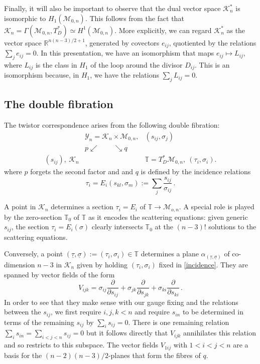 \documentclass[11pt]{article}
\newcommand{\R}{\mathbb{R}}
\newcommand{\T}{\mathbb{T}}
\newcommand{\p}{\partial}
\newcommand{\cK}{\mathcal{K}}
\newcommand{\cM}{\mathcal{M}}
\newcommand{\cY}{\mathcal{Y}}
\newcommand{\bs}{\underline{\sigma}}
\newcommand{\bt}{\underline{\tau}}
\newcommand{\1}{{\rm 1\hskip-0.25em I}}
\begin{document}
Finally, it will also be important to observe that the dual vector space $\cK_n^*$ is isomorphic to $H_1(\cM_{0,n})$. This follows from the fact that $\cK_n = \Gamma(\cM_{0,n},T^*_D) \simeq H^1(\cM_{0,n}).$ More explicitly, we can regard $\cK_n^*$ as the vector space $\R^{n(n-3)/2+1}$, generated by covectors $e_{ij}$, quotiented by the relations $\sum_j e_{ij} = 0$. In this presentation, we have an isomorphism that maps $e_{ij} \mapsto L_{ij}$, where $L_{ij}$ is the class in $H_1$ of the loop around the divisor $D_{ij}$. This is an isomorphism because, in $H_1$, we have the relations $\sum_j L_{ij} = 0$. 

\subsection{The double fibration}
The twistor correspondence  arises from the following double fibration:
\begin{eqnarray}
~& \cY_n=\cK_n\times \cM_{0,n},&(s_{ij},\sigma_j)\nonumber\\
&p\swarrow\qquad\searrow q&\nonumber\\
(s_{ij}),~ \cK_n&&\T= T^*_D \cM_{0,n}, ~ (\tau_i,\sigma_i) . 
\end{eqnarray}
where $p$ forgets the second factor and and
$q$ is defined by  the incidence relations
\begin{equation}
\tau_i =E_i(s_{kl}, \sigma_m):=\sum_j \frac{s_{ij}}{\sigma_{ij}}\, . \label{incidence}
\end{equation}

A point in $\cK_n$ determines a section $\tau_i=E_i$ of $\T\rightarrow \cM_{o,n}$. A special role is played by the zero-section $\T_0$ of $\T$ as it encodes the scattering equations: given generic $s_{ij}$, the section $\tau_i=E_i(\sigma)$ clearly intersects $\T_0$ at the $(n-3)!$ solutions to the scattering equations.

Conversely,  
a point $(\bt,\bs):=(\tau_i,\sigma_i)\in \T$ determines a plane $\alpha_{(\bt,\bs)}$ of co-dimension $n-3$ in $\cK_n$ given by holding $(\tau_i,\sigma_i)$ 
fixed in \eqref{incidence}. They are spanned by vector fields of the form
\begin{equation}
V_{ijk}=\sigma_{ij}\frac{\p}{\p s_{ij}} +\sigma_{jk} \frac{\p}{\p s_{jk}}+\sigma_{ki}\frac{\p}{\p s_{ki}}\,.
\end{equation}
In order to see that they make sense with our gauge fixing and  the relations between the $s_{ij}$, we first require $i,j,k <n$ and  require $s_{in}$ to be determined in terms of the remaining $s_{ij}$ by $\sum_i s_{ij}=0$.  There is one remaining relation $\sum_i s_{in}=\sum_{i<j<n} s_{ij}=0$ but it follows directly that $V_{ijk}$ annihilates this relation and so restricts to this subspace.   The vector fields $V_{1ij}$ with $1<i<j<n$ are a basis for the $(n-2)(n-3)/2$-planes that form the fibres of $q$. 
\end{document}
